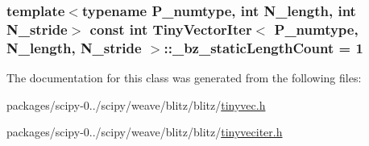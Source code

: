 \subsubsection[{\+\_\+bz\+\_\+static\+Length\+Count}]{\setlength{\rightskip}{0pt plus 5cm}template$<$typename P\+\_\+numtype, int N\+\_\+length, int N\+\_\+stride$>$ const int {\bf Tiny\+Vector\+Iter}$<$ P\+\_\+numtype, N\+\_\+length, N\+\_\+stride $>$\+::\+\_\+bz\+\_\+static\+Length\+Count = 1\hspace{0.3cm}{\ttfamily [static]}}\label{classTinyVectorIter_a7ecabfc445498738260e7a44efaaebfb}


The documentation for this class was generated from the following files\+:\begin{DoxyCompactItemize}
\item 
packages/scipy-\/0../scipy/weave/blitz/blitz/\hyperlink{tinyvec_8h}{tinyvec.\+h}\item 
packages/scipy-\/0../scipy/weave/blitz/blitz/\hyperlink{tinyveciter_8h}{tinyveciter.\+h}\end{DoxyCompactItemize}
